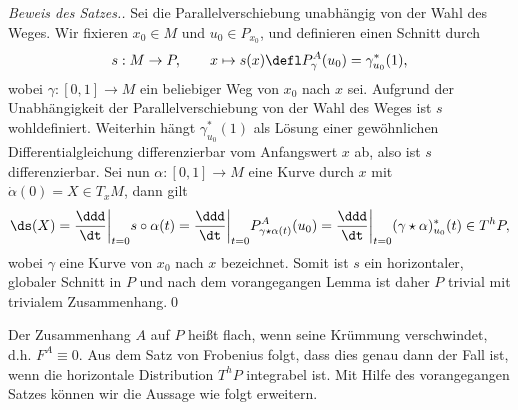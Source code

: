 \documentclass[%
	paper=a5,%
	fleqn,%
	DIV=18,%
	BCOR=0mm,
	fontsize=11pt,
	titlepage=false,%
	bibliography=totoc,
	DIV=18,%
	twoside=true,
	pdftitle=Riemannsche Geometrie,
	pdfauthor=Uwe Semmelmann,
	numbers=noendperiod]%
	{scrbook}
\begin{document}
\begin{proof}[Beweis des Satzes.]
Sei die Parallelverschiebung unabhängig von der Wahl des Weges. Wir fixieren
$x_0\in M$ und $u_0\in P_{x_0}$, und definieren einen Schnitt durch
\begin{align*}
s: M\to P,\qquad x\mapsto s(x) \defl P_\gamma^A(u_0) = \gamma_{u_0}^*(1),
\end{align*}
wobei $\gamma: [0,1]\to M$ ein beliebiger Weg von $x_0$ nach $x$ sei. Aufgrund
der Unabhängigkeit der Parallelverschiebung von der Wahl des Weges ist $s$
wohldefiniert. Weiterhin hängt $\gamma_{u_0}^*(1)$ als Lösung einer gewöhnlichen
Differentialgleichung differenzierbar vom Anfangswert $x$ ab, also ist $s$
differenzierbar. Sei nun $\alpha: [0,1]\to M$ eine Kurve durch $x$ mit
$\dot{\alpha}(0) = X\in T_xM$, dann gilt
\begin{align*}
\ds(X) = \frac{\ddd}{\dt}\bigg|_{t=0} s\circ\alpha(t)
= \frac{\ddd}{\dt}\bigg|_{t=0} P_{\gamma\star\alpha(t)}^A(u_0)
= \frac{\ddd}{\dt}\bigg|_{t=0} (\gamma\star\alpha)^*_{u_0}(t) \in T^hP,
\end{align*}
wobei $\gamma$ eine Kurve von $x_0$ nach $x$ bezeichnet. Somit ist $s$ ein
horizontaler, globaler Schnitt in $P$ und nach dem vorangegangen Lemma ist daher
$P$ trivial mit trivialem Zusammenhang.\qed 
\end{proof}

Der Zusammenhang $A$ auf $P$ heißt flach, wenn seine Krümmung verschwindet, d.h.
$F^A \equiv 0$. Aus dem Satz von Frobenius folgt, dass dies genau dann der Fall
ist, wenn die horizontale Distribution $T^hP$ integrabel ist. Mit Hilfe des
vorangegangen Satzes können wir die Aussage wie folgt erweitern.
\end{document}
